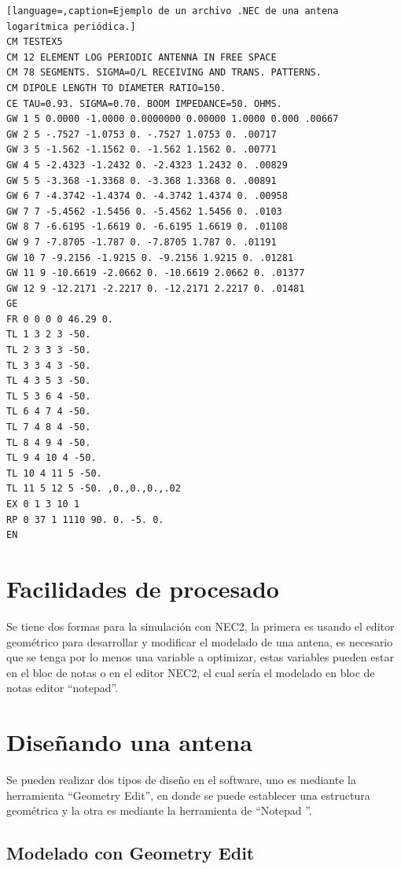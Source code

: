 \documentclass[12pt]{article}
\begin{document}
\begin{lstlisting}[language=,caption=Ejemplo de un archivo .NEC de una antena
logarítmica periódica.]
CM TESTEX5
CM 12 ELEMENT LOG PERIODIC ANTENNA IN FREE SPACE
CM 78 SEGMENTS. SIGMA=O/L RECEIVING AND TRANS. PATTERNS.
CM DIPOLE LENGTH TO DIAMETER RATIO=150.
CE TAU=0.93. SIGMA=0.70. BOOM IMPEDANCE=50. OHMS.
GW 1 5 0.0000 -1.0000 0.0000000 0.00000 1.0000 0.000 .00667
GW 2 5 -.7527 -1.0753 0. -.7527 1.0753 0. .00717
GW 3 5 -1.562 -1.1562 0. -1.562 1.1562 0. .00771
GW 4 5 -2.4323 -1.2432 0. -2.4323 1.2432 0. .00829
GW 5 5 -3.368 -1.3368 0. -3.368 1.3368 0. .00891
GW 6 7 -4.3742 -1.4374 0. -4.3742 1.4374 0. .00958
GW 7 7 -5.4562 -1.5456 0. -5.4562 1.5456 0. .0103
GW 8 7 -6.6195 -1.6619 0. -6.6195 1.6619 0. .01108
GW 9 7 -7.8705 -1.787 0. -7.8705 1.787 0. .01191
GW 10 7 -9.2156 -1.9215 0. -9.2156 1.9215 0. .01281
GW 11 9 -10.6619 -2.0662 0. -10.6619 2.0662 0. .01377
GW 12 9 -12.2171 -2.2217 0. -12.2171 2.2217 0. .01481
GE
FR 0 0 0 0 46.29 0.
TL 1 3 2 3 -50.
TL 2 3 3 3 -50.
TL 3 3 4 3 -50.
TL 4 3 5 3 -50.
TL 5 3 6 4 -50.
TL 6 4 7 4 -50.
TL 7 4 8 4 -50.
TL 8 4 9 4 -50.
TL 9 4 10 4 -50.
TL 10 4 11 5 -50.
TL 11 5 12 5 -50. ,0.,0.,0.,.02
EX 0 1 3 10 1 
RP 0 37 1 1110 90. 0. -5. 0.
EN
\end{lstlisting}

\section{Facilidades de procesado}

Se tiene dos formas para la simulación con NEC2, la primera es usando el editor
geométrico para desarrollar y modificar el modelado de una antena, es necesario
que se tenga por lo menos una variable a optimizar, estas variables pueden
estar en el bloc de notas o en el editor NEC2, el cual sería el modelado en
bloc de notas editor ``notepad''.

\section{Diseñando una antena}

Se pueden realizar dos tipos de diseño en el software, uno es mediante la
herramienta ``Geometry Edit'', en donde se puede establecer una estructura
geométrica y la otra es mediante la herramienta de ``Notepad ''.

\subsection{Modelado con Geometry Edit}
\end{document}
